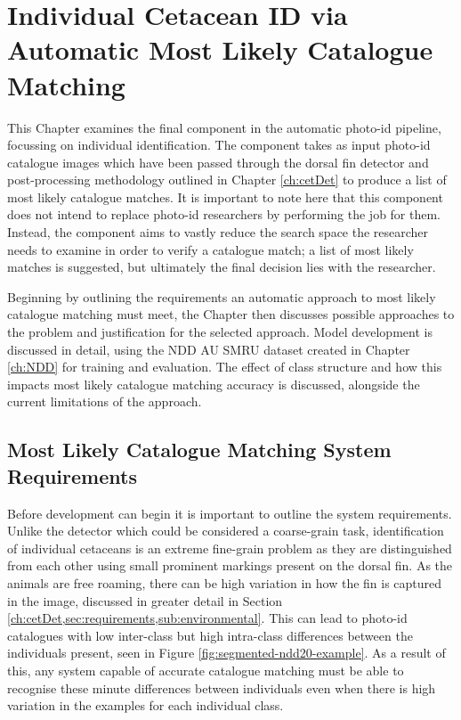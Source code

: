 \chapter{Individual Cetacean ID via Automatic Most Likely Catalogue Matching}\label{ch:ID}

This Chapter examines the final component in the automatic photo-id pipeline, focussing on individual identification. The component takes as input photo-id catalogue images which have been passed through the dorsal fin detector and post-processing methodology outlined in Chapter \ref{ch:cetDet} to produce a list of most likely catalogue matches. It is important to note here that this component does not intend to replace photo-id researchers by performing the job for them. Instead, the component aims to vastly reduce the search space the researcher needs to examine in order to verify a catalogue match; a list of most likely matches is suggested, but ultimately the final decision lies with the researcher.

Beginning by outlining the requirements an automatic approach to most likely catalogue matching must meet, the Chapter then discusses possible approaches to the problem and justification for the selected approach. Model development is discussed in detail, using the NDD AU SMRU dataset created in Chapter \ref{ch:NDD} for training and evaluation. The effect of class structure and how this impacts most likely catalogue matching accuracy is discussed, alongside the current limitations of the approach. 

\section{Most Likely Catalogue Matching System Requirements}\label{ch:ID,sec:Requirements}

Before development can begin it is important to outline the system requirements. Unlike the detector which could be considered a coarse-grain task, identification of individual cetaceans is an extreme fine-grain problem as they are distinguished from each other using small prominent markings present on the dorsal fin. As the animals are free roaming, there can be high variation in how the fin is captured in the image, discussed in greater detail in Section \ref{ch:cetDet,sec:requirements,sub:environmental}. This can lead to photo-id catalogues with low inter-class but high intra-class differences between the individuals present, seen in Figure \ref{fig:segmented-ndd20-example}. As a result of this, any system capable of accurate catalogue matching must be able to recognise these minute differences between individuals even when there is high variation in the examples for each individual class. 

